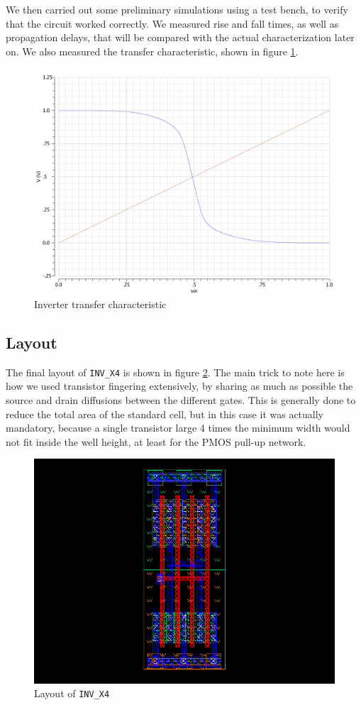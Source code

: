 \documentclass[a4paper]{article}
\newcommand{\inv}{\texttt{INV\_X4}\xspace}
\begin{document}
We then carried out some preliminary simulations using a test bench, to verify that the circuit worked correctly. We measured rise and fall times, as well as propagation delays, that will be compared with the actual characterization later on. We also measured the transfer characteristic, shown in figure \ref{fig:inv_tchar}.
\begin{figure}[H]
	\centering
	\includegraphics[width=.7\linewidth]{../INV_X4/INV_X4_transfer_char.pdf}
	\caption{Inverter transfer characteristic}
	\label{fig:inv_tchar}
\end{figure}

\subsection{Layout}
The final layout of \inv is shown in figure \ref{fig:inv_layout}. The main trick to note here is how we used transistor fingering extensively, by sharing as much as possible the source and drain diffusions between the different gates. This is generally done to reduce the total area of the standard cell, but in this case it was actually mandatory, because a single transistor large 4 times the minimum width would not fit inside the well height, at least for the PMOS pull-up network.
\begin{figure}[H]
	\centering
	\includegraphics[width=\linewidth]{../INV_X4/INV_X4_layout.png}
	\caption{Layout of \inv}
	\label{fig:inv_layout}
\end{figure}
\end{document}
